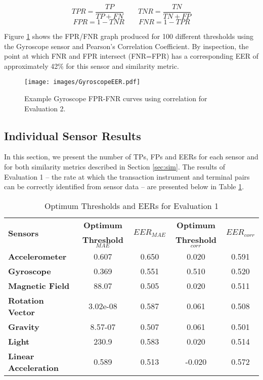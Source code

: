\documentclass[runningheads,a4paper]{llncs}
\begin{document}
\begin{equation}
	TPR = \frac{TP}{TP + FN}
	\qquad
	TNR = \frac{TN}{TN + FP}
	\label{eq:tpr}
\end{equation}
\begin{equation}
	FPR = 1 - TNR 
	\qquad
	FNR = 1 - TPR
	\label{eq:fpr}
\end{equation}

Figure \ref{fig:eer} shows the FPR/FNR graph produced for 100 different thresholds using the Gyroscope sensor and Pearson's Correlation Coefficient.  By inspection, the point at which FNR and FPR intersect (FNR=FPR) has a corresponding EER of approximately 42\% for this sensor and similarity metric.

\begin{figure}[ht]
	\centering
	\texttt{[image: images/GyroscopeEER.pdf]}
	\caption{Example Gyroscope FPR-FNR curves using correlation for Evaluation 2.}
	\label{fig:eer}
\end{figure}

\subsection{Individual Sensor Results}

In this section, we present the number of TPs, FPs and EERs for each sensor and for both similarity metrics described in Section \ref{sec:sim}.  The results of Evaluation 1 -- the rate at which the transaction instrument and terminal pairs can be correctly identified from sensor data -- are presented below in Table \ref{tab:ev1}.

\begin{table}[ht]
	\centering
	\caption{Optimum Thresholds and EERs for Evaluation 1}
	\label{tab:ev1}
\begin{tabular}{@{}lcccc@{}}
			\toprule
			\multirow{2}{*}{\textbf{Sensors}} & \textbf{Optimum} & \multirow{2}{*}{\textbf{$EER_{MAE}$}} & \textbf{Optimum} & \multirow{2}{*}{\textbf{$EER_{corr}$}} \\ 
			& \textbf{Threshold$_{MAE}$} & & \textbf{Threshold$_{corr}$}& \\
			\midrule
			\textbf{Accelerometer} & 0.607 & 0.650 & 0.020 & 0.591 \\
			\textbf{Gyroscope} & 0.369 & 0.551 & 0.510 & 0.520 \\
			\textbf{Magnetic Field} & 88.07 & 0.505 & 0.020 & 0.511 \\
			\textbf{Rotation Vector} & 3.02e-08 & 0.587 & 0.061 & 0.508 \\
			\textbf{Gravity} & 8.57-07 & 0.507 & 0.061 & 0.501 \\
			\textbf{Light} & 230.9 & 0.583 & 0.020 & 0.514 \\
			\textbf{Linear Acceleration} & 0.589 & 0.513 & -0.020 & 0.572 \\
			\bottomrule
		\end{tabular}
\end{table}
\end{document}
